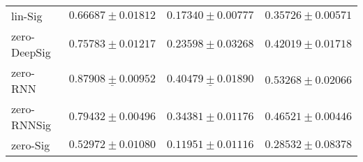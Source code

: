 \begin{tabular}{llll}
lin-Sig        &                           $ 0.66687 \pm 0.01812 $ &                           $ 0.17340 \pm 0.00777 $ &                           $ 0.35726 \pm 0.00571 $ \\
zero-DeepSig   &                           $ 0.75783 \pm 0.01217 $ &                           $ 0.23598 \pm 0.03268 $ &                           $ 0.42019 \pm 0.01718 $ \\
zero-RNN       &            $  \underline{ 0.87908 \pm 0.00952 } $ &            $  \underline{ 0.40479 \pm 0.01890 } $ &                           $ 0.53268 \pm 0.02066 $ \\
zero-RNNSig    &                           $ 0.79432 \pm 0.00496 $ &                           $ 0.34381 \pm 0.01176 $ &                           $ 0.46521 \pm 0.00446 $ \\
zero-Sig       &                           $ 0.52972 \pm 0.01080 $ &                           $ 0.11951 \pm 0.01116 $ &                           $ 0.28532 \pm 0.08378 $ \\
\bottomrule
\end{tabular}

